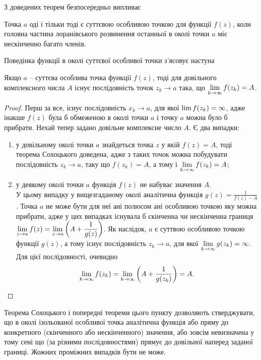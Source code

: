 З доведених теорем безпосередньо випливає
\begin{theorem}
	Точка $a$ оді і тільки тоді є суттєвою особливою точкою для функції $f(z)$, коли головна частина лоранівського розвинення останньої в околі точки $a$ міє нескінченно багато членів.
\end{theorem}

Поведінка функції в околі суттєвої особливої точки з'ясовує настуна
\begin{theorem}[Ю. В. Сохоцький, 1868 р.]
	Якщо $a$ -- суттєва особлива точка функції $f(z)$, тоді для довільного комплексного числа $A$ існує послідовність точок $z_k \to a$ така, що $\displaystyle\lim\limits_{k \to \infty} f(z_k) = A$.
\end{theorem}

\begin{proof}
	Перш за все, існує послідовність $x_k \to a$, для якої  $\displaystyle\lim\limits f(z_k) = \infty$, адже інакше $f(z)$ була б обмеженою в околі точки $a$ і точку $a$ можна було б прибрати. Нехай тепер задано довільне комплексне число $A$. Є два випадки:
	\begin{enumerate}
		\item у довільному околі точки $a$ знайдеться точка $z$ у якій $f(z) = A$, тоді теорема Сохоцького доведена, адже з таких точок можна побудувати послідовність $z_k \to a$, таку що $f(z_k) = A$, а тому і $\displaystyle\lim\limits_{k \to \infty} f(z_k) = A$;

		\item у деякому околі точки $a$ функція $f(z)$ не набуває значення $A$. \\

		У цьому випадку у вищезгаданому околі аналітична функція $g(z) = \frac{1}{f(z) - A}$. Точка $a$ не може бути для неї ані полюсом ані особливою точкою яку можна прибрати, адже у цих випадках існувала б скінченна чи нескінченна границя $\displaystyle\lim\limits_{z \to a} f(z) = \displaystyle\lim\limits_{z \to a} \left( A + \frac{1}{g(z)} \right)$. Як наслідок, $a$ є суттвою особливою точкою функції $g(z)$, а тому існує послідовність $z_k \to a$, для якої $\displaystyle\lim\limits_{k \to \infty} g(z_k) = \infty$. Для цієї послідовності, очевидно
		\begin{equation*}
			\displaystyle\lim\limits_{k \to \infty} f(z_k) = \displaystyle\lim\limits_{k \to \infty} \left( A + \frac{1}{g(z_k)} \right) = A.
		\end{equation*}
	\end{enumerate}
\end{proof}

Теорема Сохоцького і попередні теореми цього пункту дозволяють стверджувати, що в околі ізольованої особливої точка аналітична функція або пряму до конкретного (скінченного або нескінченного) значення, або зовсім невизначена у тому сені що (за різними послідовностями) прямує до довільної наперед заданої границі. Жожних проміжних випадків бути не може. \\

